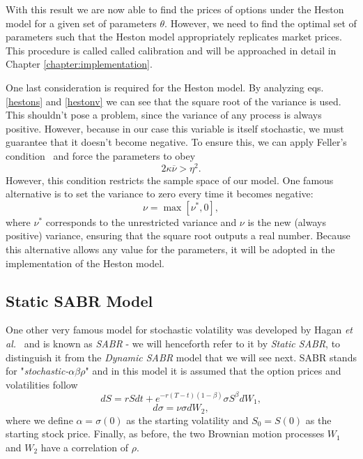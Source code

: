 With this result we are now able to find the prices of options under the Heston model for a given set of parameters $\theta$. However, we need to find the optimal set of parameters such that the Heston model appropriately replicates market prices. This procedure is called called calibration and will be approached in detail in Chapter \ref{chapter:implementation}.


One last consideration is required for the Heston model.
By analyzing eqs.\eqref{hestons} and \eqref{hestonv} we can see that the square root of the variance is used. This shouldn't pose a problem, since the variance of any process is always positive. However, because in our case this variable is itself stochastic, we must guarantee that it doesn't become negative. To ensure this, we can apply Feller's condition~\cite{feller} and force the parameters to obey
\begin{equation}
2\kappa\overline{\nu}>\eta^2.
\end{equation}
\noindent However, this condition restricts the sample space of our model. One famous alternative is to set the variance to zero every time it becomes negative:
\begin{equation}
\nu=\max\left[\nu^*,0\right],
\end{equation}
\noindent where $\nu^*$ corresponds to the unrestricted variance and $\nu$ is the new (always positive) variance, ensuring that the square root outputs a real number. Because this alternative allows any value for the parameters, it will be adopted in the implementation of the Heston model.


\subsection{Static SABR Model}
One other very famous model for stochastic volatility was developed by Hagan \textit{et al.}~\cite{Hagan} and is known as \emph{SABR} - we will henceforth refer to it by \emph{Static SABR}, to distinguish it from the \emph{Dynamic SABR} model that we will see next. SABR stands for "\emph{stochastic-}$\alpha\beta\rho$" and in this model it is assumed that the option prices and volatilities follow~\cite{Geeske}
\begin{equation}\label{dF}
\boxed{dS=rSdt+e^{-r(T-t)(1-\beta)}\sigma S^\beta dW_1,}
\end{equation}
\begin{equation}\label{dsigma}
\boxed{d\sigma=\nu\sigma dW_2,}
\end{equation}
\noindent where we define $\alpha=\sigma(0)$ as the starting volatility and $S_0=S(0)$ as the starting stock price. Finally, as before, the two Brownian motion processes $W_1$ and $W_2$ have a correlation of $\rho$.

